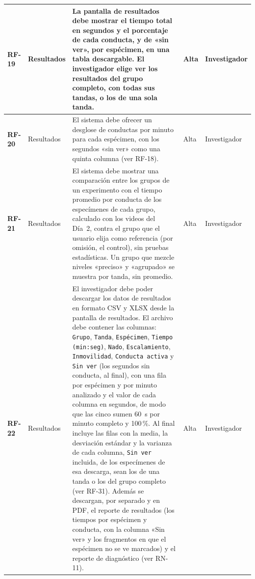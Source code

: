 \begin{longtable}{|>{\bfseries}p{1.1cm}|>{\raggedright}p{2.8cm}|>{\raggedright\arraybackslash}p{5.7cm}|p{1.3cm}|p{2.2cm}|}
RF-19 & Resultados
      & La pantalla de resultados debe mostrar el tiempo total en segundos y el
        porcentaje de cada conducta, y de «sin ver», por espécimen, en una tabla
        descargable. El investigador elige ver los resultados del grupo completo,
        con todas sus tandas, o los de una sola tanda.
      & Alta & Investigador \\
\hline
RF-20 & Resultados
      & El sistema debe ofrecer un desglose de conductas por minuto para cada espécimen,
        con los segundos «sin ver» como una quinta columna (ver RF-18).
      & Alta & Investigador \\
\hline
RF-21 & Resultados
      & El sistema debe mostrar una comparación entre los grupos de un experimento
        con el tiempo promedio por conducta de los especímenes de cada grupo,
        calculado con los videos del Día~2, contra el grupo que el usuario elija como referencia (por omisión, el control),
        sin pruebas estadísticas. Un grupo que mezcle niveles «preciso» y «agrupado» se muestra por tanda, sin promedio.
      & Alta & Investigador \\
\hline
RF-22 & Resultados
      & El investigador debe poder descargar los datos de resultados en formato CSV
        y XLSX desde la pantalla de resultados. El archivo debe
        contener las columnas: \texttt{Grupo}, \texttt{Tanda}, \texttt{Espécimen},
        \texttt{Tiempo (min:seg)}, \texttt{Nado}, \texttt{Escalamiento},
        \texttt{Inmovilidad}, \texttt{Conducta activa} y \texttt{Sin ver} (los
        segundos sin conducta, al final), con una fila por espécimen
        y por minuto analizado y el valor de cada columna en segundos, de modo que
        las cinco sumen 60~s por minuto completo y 100\,\%. Al final
        incluye las filas con la media, la desviación estándar y la varianza de cada
        columna, \texttt{Sin ver} incluida, de los especímenes de esa descarga, sean los de una tanda o los del
        grupo completo (ver RF-31). Además se descargan, por
        separado y en PDF, el reporte de resultados (los tiempos por espécimen y
        conducta, con la columna «Sin ver» y los fragmentos en que el espécimen no se ve marcados) y el
        reporte de diagnóstico (ver RN-11).
      & Alta & Investigador \\
\hline


\end{longtable}
